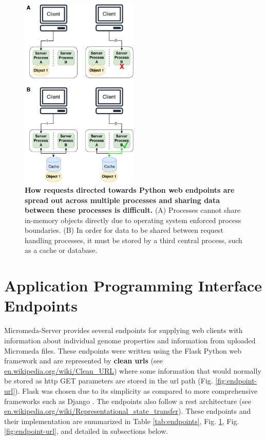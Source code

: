 \begin{figure}[!ht]
  \centering
	\includegraphics[width=0.50\textwidth]{media/Client-Processing.pdf}
	 \caption[How requests directed towards Python web endpoints are spread out across 
multiple processes and sharing data between these processes is 
difficult.]{\textbf{How requests directed towards Python web endpoints are spread 
out across multiple processes and sharing data between these processes is 
difficult.} (A) Processes cannot share in-memory objects directly due to 
operating system enforced process boundaries. (B) In order for data to be shared 
between request handling processes, it must be stored by a third central 
process, such as a cache or database.}
	 \label{fig:client-processing}
\end{figure}

\section{Application Programming Interface Endpoints} \label{endpoints}

Micromeda-Server provides several endpoints for supplying web clients with 
information about individual genome properties and information from uploaded 
Micromeda files. These endpoints were written using the Flask Python web 
framework \cite{grinberg2018flask} and are represented by \textbf{clean 
\gls{url}s} (see 
\href{http://en.wikipedia.org/wiki/Clean_URL}{en.wikipedia.org/wiki/Clean\_URL}) 
where some information that would normally be stored as \gls{http} GET 
parameters are stored in the \gls{url} path (Fig. \ref{fig:endpoint-url}). Flask 
was chosen due to its simplicity as compared to more comprehensive frameworks 
such as Django \cite{holovaty2009definitive}. The endpoints also follow a 
\gls{rest} architecture \cite{fielding2000representational} (see 
\href{http://en.wikipedia.org/wiki/Representational_state_transfer}{en.wikipedia.org/wiki/Representational\_state\_transfer}). 
These endpoints and their implementation are summarized in Table 
\ref{tab:endpoints}, Fig. \ref{endpoints}, Fig. \ref{fig:endpoint-url}, and 
detailed in subsections below.

